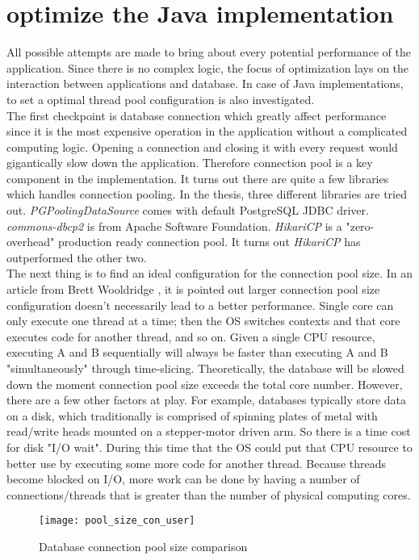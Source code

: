 \section{optimize the Java implementation}
All possible attempts are made to bring about every potential performance of the application. Since there is no complex logic, the focus of optimization lays on the interaction between applications and database. In case of Java implementations, to set a optimal thread pool configuration is also investigated. \\
The first checkpoint is database connection which greatly affect performance since it is the most expensive operation in the application without a complicated computing logic. Opening a connection and closing it with every request would gigantically slow down the application. Therefore connection pool is a key component in the implementation. It turns out there are quite a few libraries which handles connection pooling. In the thesis,  three different libraries are tried out. \textit{PGPoolingDataSource}  \citep{pgpool}   comes with default PostgreSQL JDBC driver. \textit{commons-dbcp2} \citep{dbcp} is from Apache Software Foundation. \textit{HikariCP} is a "zero-overhead" production ready connection pool. It turns out \textit{HikariCP} \citep{hikari} has outperformed the other two. \\
The next thing is to find an ideal configuration for the connection pool size. In an article from Brett Wooldridge \citep{hikari}, it is pointed out larger connection pool size configuration doesn't necessarily lead to a better performance. Single core can only execute one thread at a time; then the OS switches contexts and that core executes code for another thread, and so on. Given a single CPU resource, executing A and B sequentially will always be faster than executing A and B "simultaneously" through time-slicing. Theoretically, the database will be slowed down the moment connection pool size exceeds the total core number. However, there are a few other factors at play. For example, databases typically store data on a disk, which traditionally is comprised of spinning plates of metal with read/write heads mounted on a stepper-motor driven arm. So there is a time cost for disk "I/O wait".  During this time that the OS could put that CPU resource to better use by executing some more code for another thread. Because threads become blocked on I/O,  more work can be done by having a number of connections/threads that is greater than the number of physical computing cores.
\begin{figure}[h]
	\centering
	\texttt{[image: pool\_size\_con\_user]}
	\caption{Database connection pool size comparison}
	\label{pool-comparison}
\end{figure}
